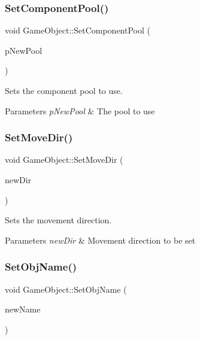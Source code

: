 \subsubsection{\texorpdfstring{Set\+Component\+Pool()}{SetComponentPool()}}
{\footnotesize\ttfamily void Game\+Object\+::\+Set\+Component\+Pool (\begin{DoxyParamCaption}\item[{\mbox{\hyperlink{class_component_pool}{Component\+Pool}} $\ast$}]{p\+New\+Pool }\end{DoxyParamCaption})\hspace{0.3cm}{\ttfamily [inline]}}



Sets the component pool to use. 


\begin{DoxyParams}{Parameters}
{\em p\+New\+Pool} & The pool to use \\
\hline
\end{DoxyParams}
\mbox{\label{class_game_object_a11c2fa0ca47cbeb27d4887573a913438}} 
\subsubsection{\texorpdfstring{Set\+Move\+Dir()}{SetMoveDir()}}
{\footnotesize\ttfamily void Game\+Object\+::\+Set\+Move\+Dir (\begin{DoxyParamCaption}\item[{\mbox{\hyperlink{struct_vector2_d}{Vector2D}}}]{new\+Dir }\end{DoxyParamCaption})\hspace{0.3cm}{\ttfamily [inline]}}



Sets the movement direction. 


\begin{DoxyParams}{Parameters}
{\em new\+Dir} & Movement direction to be set \\
\hline
\end{DoxyParams}
\mbox{\label{class_game_object_a400594b6957192dfe9cddaa513f49d7e}} 
\subsubsection{\texorpdfstring{Set\+Obj\+Name()}{SetObjName()}}
{\footnotesize\ttfamily void Game\+Object\+::\+Set\+Obj\+Name (\begin{DoxyParamCaption}\item[{std\+::string}]{new\+Name }\end{DoxyParamCaption})\hspace{0.3cm}{\ttfamily [inline]}}




